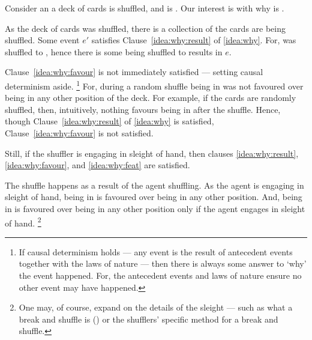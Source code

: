 \begin{note}
  Consider an  a deck of cards is shuffled, and \mainCard{} is \mainCardPos{}.
  Our interest is with why \mainCard{} is \mainCardPos{}.

  As the deck of cards was shuffled, there is a collection of  the cards are being shuffled.
  Some event \(e'\) satisfies Clause~\ref{idea:why:result} of \autoref{idea:why}.
  For, \mainCard{} was shuffled to \mainCardPosX{}, hence there is some  \mainCard{} being shuffled to \mainCardPos{} results in \(e\).

  Clause~\ref{idea:why:favour} is not immediately satisfied --- setting causal determinism aside.%
  \footnote{
    \nocite{Hoefer:2023aa}%
    If causal determinism holds --- any event is the result of antecedent events together with the laws of nature --- then there is always some answer to `why' the event happened.
    For, the antecedent events and laws of nature ensure no other event may have happened.
  }
  For, during a random shuffle \mainCard{} being in \mainCardPos{} was not favoured over \mainCard{} being in any other position of the deck.
  For example, if the cards are randomly shuffled, then, intuitively, nothing favours \mainCard{} being in \mainCardPos{} after the shuffle.
  Hence, though Clause~\ref{idea:why:result} of \autoref{idea:why} is satisfied, Clause~\ref{idea:why:favour} is not satisfied.

  Still, if the shuffler is engaging in sleight of hand, then clauses \ref{idea:why:result}, \ref{idea:why:favour}, and \ref{idea:why:feat} are satisfied.

  The shuffle happens as a result of the agent shuffling.
  As the agent is engaging in sleight of hand, \mainCard{} being in \mainCardPos{} is favoured over \mainCard{} being in any other position.
  And, \mainCard{} being in \mainCardPos{} is favoured over \mainCard{} being in any other position only if the agent engages in sleight of hand.%
  \footnote{
    One may, of course, expand on the details of the sleight --- such as what a break and shuffle is (\cite[cf.][189--190]{Hilliard:1994aa}) or the shufflers' specific method for a break and shuffle.
  }
\end{note}


